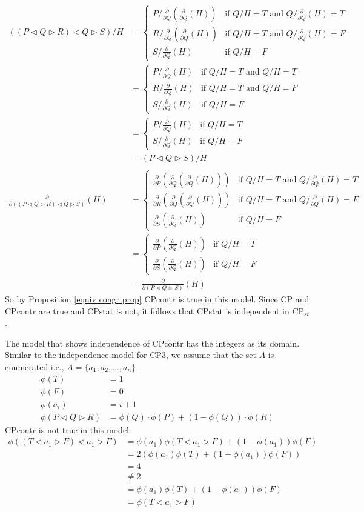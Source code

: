 \documentclass[a4paper,twoside,openright]{report}
\newcommand{\dd}[1]{\frac{\partial}{\partial #1}}
\newcommand{\lef}{\ensuremath{\triangleleft}}
\newcommand{\rig}{\ensuremath{\triangleright}}
\begin{document}
\begin{align*}
((P\lef Q\rig R)\lef Q\rig S)/H
&=\begin{cases}
P/\dd Q(\dd Q(H)) & \text{if $Q/H=T$ and $Q/\dd Q(H)=T$}\\
R/\dd Q(\dd Q(H)) & \text{if $Q/H=T$ and $Q/\dd Q(H)=F$}\\
S/\dd Q(H) & \text{if $Q/H=F$}
\end{cases}\\
&=\begin{cases}
P/\dd Q(H) & \text{if $Q/H=T$ and $Q/H=T$}\\
R/\dd Q(H) & \text{if $Q/H=T$ and $Q/H=F$}\\
S/\dd Q(H) & \text{if $Q/H=F$}
\end{cases}\\
&=\begin{cases}
P/\dd Q(H) & \text{if $Q/H=T$}\\
S/\dd Q(H) & \text{if $Q/H=F$}
\end{cases}\\
&=(P\lef Q\rig S)/H\\\\
\dd{((P\lef Q\rig R)\lef Q\rig S)}(H)
&=\begin{cases}
\dd P(\dd Q(\dd Q(H))) & \text{if $Q/H=T$ and $Q/\dd Q(H)=T$}\\
\dd R(\dd Q(\dd Q(H))) & \text{if $Q/H=T$ and $Q/\dd Q(H)=F$}\\
\dd S(\dd Q(H)) & \text{if $Q/H=F$}
\end{cases}\\
&=\begin{cases}
\dd P(\dd Q(H)) & \text{if $Q/H=T$}\\
\dd S(\dd Q(H)) & \text{if $Q/H=F$}
\end{cases}\\
&=\dd{(P\lef Q\rig S)}(H)
\end{align*}
So by Proposition \ref{equiv congr prop} CPcontr is true in this model. Since CP and CPcontr are true and CPstat is not, it follows that CPstat is independent in $\text{CP}_{st}$.

The model that shows independence of CPcontr has the integers as its domain. Similar to the independence-model for CP3, we assume that the set $A$ is enumerated i.e., $A=\{a_1,a_2,\ldots,a_n\}$.
\begin{align*}
\phi(T) &= 1\\
\phi(F) &= 0\\
\phi(a_i) &= i+1\\
\phi(P\lef Q\rig R) &= \phi(Q)\cdot\phi(P)+(1-\phi(Q))\cdot\phi(R)
\end{align*}
CPcontr is not true in this model:
\begin{align*}
\phi((T\lef a_1\rig F)\lef a_1\rig F)
&=\phi(a_1)\phi(T\lef a_1\rig F)+(1-\phi(a_1))\phi(F)\\
&=2(\phi(a_1)\phi(T)+(1-\phi(a_1))\phi(F))\\
&=4\\
&\ne 2\\
&=\phi(a_1)\phi(T)+(1-\phi(a_1))\phi(F)\\
&=\phi(T\lef a_1\rig F)
\end{align*}
\end{document}
